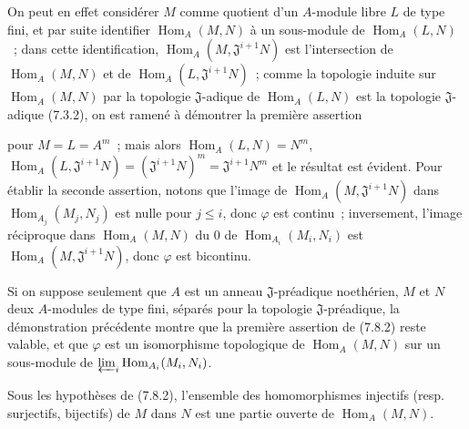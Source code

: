 On peut en effet considérer $M$ comme quotient d'un $A$-module libre $L$ de
type fini, et par suite identifier $\operatorname{Hom}_A(M,N)$ à un sous-module de
$\operatorname{Hom}_A(L,N)$~; dans cette identification,
$\operatorname{Hom}_A(M,\mathfrak J^{i+1}N)$ est l'intersection de $\operatorname{Hom}_A(M,N)$ et de
$\operatorname{Hom}_A(L,\mathfrak J^{i+1}N)$~; comme la topologie induite sur
$\operatorname{Hom}_A(M,N)$ par la topologie $\mathfrak J$-adique de $\operatorname{Hom}_A(L,N)$ est
la topologie $\mathfrak J$-adique (7.3.2), on est ramené à démontrer la
première assertion


pour $M=L=A^m$~; mais alors $\operatorname{Hom}_A(L,N)=N^m$,
$\operatorname{Hom}_A(L,\mathfrak J^{i+1}N)=(\mathfrak J^{i+1}N)^m=
\mathfrak J^{i+1}N^m$ et le résultat est évident. Pour établir la seconde
assertion, notons que l'image de $\operatorname{Hom}_A(M,\mathfrak J^{i+1}N)$ dans
$\operatorname{Hom}_{A_j}(M_j,N_j)$ est nulle pour $j\leq i$, donc $\varphi$ est
continu~; inversement, l'image réciproque dans $\operatorname{Hom}_A(M,N)$ du $0$ de
$\operatorname{Hom}_{A_i}(M_i,N_i)$ est $\operatorname{Hom}_A(M,\mathfrak J^{i+1}N)$, donc $\varphi$
est bicontinu.

Si on suppose seulement que $A$ est un anneau $\mathfrak J$-préadique
noethérien, $M$ et $N$ deux $A$-modules de type fini, séparés pour la
topologie $\mathfrak J$-préadique, la démonstration précédente montre que
la première assertion de (7.8.2) reste valable, et que $\varphi$ est un
isomorphisme topologique de $\operatorname{Hom}_A(M,N)$ sur un sous-module de
$\varprojlim_i\operatorname{Hom}_{A_i}(M_i,N_i)$.

\begin{proposition}[7.8.3]
\label{0.7.8.3-fr}
Sous les hypothèses de (7.8.2), l'ensemble des homomorphismes injectifs
(resp. surjectifs, bijectifs) de $M$ dans $N$ est une partie ouverte de
$\operatorname{Hom}_A(M,N)$.
\end{proposition}

